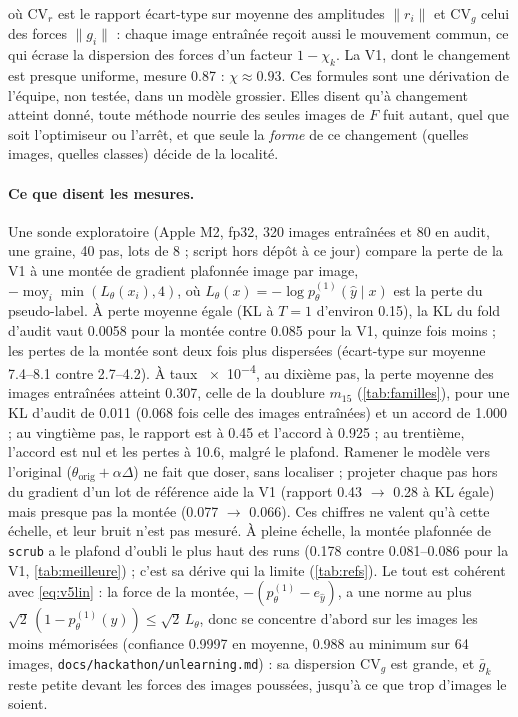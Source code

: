 \documentclass[11pt,a4paper]{article}
\newcommand{\Exp}{\operatorname*{moy}}
\newcommand{\orig}{\mathrm{orig}}
\newcommand{\code}[1]{\texttt{#1}}
\newcommand{\chemin}[1]{\nolinkurl{#1}}%
\begin{document}
où $\mathrm{CV}_r$ est le rapport écart-type sur moyenne des amplitudes $\|r_i\|$ et $\mathrm{CV}_g$
celui des forces $\|g_i\|$ : chaque image entraînée reçoit aussi le mouvement commun, ce qui écrase la
dispersion des forces d'un facteur $1-\chi_k$. La V1, dont le changement est presque uniforme, mesure
\num{0.87} : $\chi\approx\num{0.93}$. Ces formules sont une dérivation de l'équipe, non testée, dans un
modèle grossier. Elles disent qu'à changement atteint donné, toute méthode nourrie des seules images de
$F$ fuit autant, quel que soit l'optimiseur ou l'arrêt, et que seule la \emph{forme} de ce changement
(quelles images, quelles classes) décide de la localité.

\paragraph{Ce que disent les mesures.} Une sonde exploratoire (Apple M2, fp32, 320 images entraînées
et 80 en audit, une graine, 40 pas, lots de 8 ; script hors dépôt à ce jour) compare la perte de la V1
à une montée de gradient plafonnée image par image, $-\Exp_i\min(L_\theta(x_i),4)$, où
$L_\theta(x)=-\log p^{(1)}_\theta(\hat y\mid x)$ est la perte du pseudo-label. À perte moyenne égale (KL
à $T=1$ d'environ \num{0.15}), la KL du fold d'audit vaut \num{0.0058} pour la montée contre
\num{0.085} pour la V1, quinze fois moins ; les pertes de la montée sont deux fois plus dispersées
(écart-type sur moyenne \numrange{7.4}{8.1} contre \numrange{2.7}{4.2}). À taux \num{e-4}, au dixième
pas, la perte moyenne des images entraînées atteint \num{0.307}, celle de la doublure $m_{15}$
(\cref{tab:familles}), pour une KL d'audit de \num{0.011} (\num{0.068} fois celle des images
entraînées) et un accord de \num{1.000} ; au vingtième pas, le rapport est à \num{0.45} et l'accord à
\num{0.925} ; au trentième, l'accord est nul et les pertes à \num{10.6}, malgré le plafond. Ramener le
modèle vers l'original ($\theta_\orig+\alpha\Delta$) ne fait que doser, sans localiser ; projeter chaque
pas hors du gradient d'un lot de référence aide la V1 (rapport \num{0.43} $\to$ \num{0.28} à KL égale)
mais presque pas la montée (\num{0.077} $\to$ \num{0.066}). Ces chiffres ne valent qu'à cette échelle,
et leur bruit n'est pas mesuré. À pleine échelle, la montée plafonnée de \code{scrub} a le plafond
d'oubli le plus haut des runs (\num{0.178} contre \numrange{0.081}{0.086} pour la V1,
\cref{tab:meilleure}) ; c'est sa dérive qui la limite (\cref{tab:refs}). Le tout est cohérent avec
\eqref{eq:v5lin} : la force de la montée, $-(p^{(1)}_\theta-e_{\hat y})$, a une norme au plus
$\sqrt2\,(1-p^{(1)}_\theta(\hat y))\le\sqrt2\,L_\theta$, donc se concentre d'abord sur les images les
moins mémorisées (confiance \num{0.9997} en moyenne, \num{0.988} au minimum sur 64 images,
\chemin{docs/hackathon/unlearning.md}) : sa dispersion $\mathrm{CV}_g$ est grande, et $\bar g_k$ reste
petite devant les forces des images poussées, jusqu'à ce que trop d'images le soient.
\end{document}
